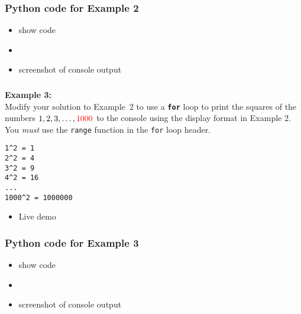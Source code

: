 \documentclass[english,14pt]{beamer}
\newcommand\red[1]{{\color{red} #1}}
\begin{document}

\begin{frame}[fragile]

\frametitle{Python code for Example 2}

\begin{itemize}
	\item show code
	\item[]
	\item screenshot of console output
\end{itemize}
\end{frame}


\begin{frame}[fragile]

\frametitle{}

\frametitle{}

\textbf{Example 3:}\\
\vspace*{5mm}
Modify your solution to Example~2 to use a \textbf{\texttt{for}} loop to print the squares of the numbers $1, 2, 3, \ldots, \red{1000}$ to the console using the display format in Example 2. You \emph{must} use the \texttt{range} function in the \texttt{for} loop header.
\begin{verbatim}
1^2 = 1
2^2 = 4
3^2 = 9
4^2 = 16
...
1000^2 = 1000000
\end{verbatim}

\begin{itemize}
	\item Live demo
\end{itemize}
	
\end{frame}


\begin{frame}[fragile]

\frametitle{Python code for Example 3}

\begin{itemize}
	\item show code
	\item[]
	\item screenshot of console output
\end{itemize}
\end{frame}

\end{document}
